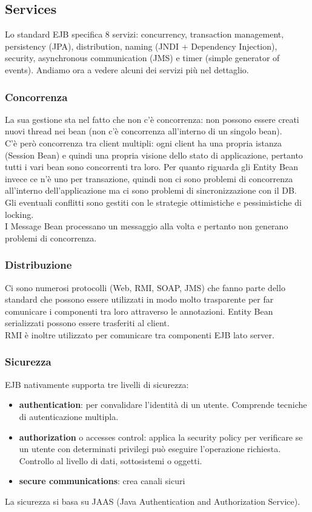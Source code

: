 \subsection{Services}
Lo standard EJB specifica 8 servizi: concurrency, transaction management, persistency (JPA), distribution, naming (JNDI + Dependency Injection), security, asynchronous communication (JMS) e timer (simple generator of events). Andiamo ora a vedere alcuni dei servizi più nel dettaglio.

\subsubsection{Concorrenza}
La sua gestione sta nel fatto che non c’è concorrenza: non possono essere creati nuovi thread nei bean (non c’è concorrenza all’interno di un singolo bean).\\

C’è però concorrenza tra client multipli: ogni client ha una propria istanza (Session Bean) e quindi una propria visione dello stato di applicazione, pertanto tutti i vari bean sono concorrenti tra loro. Per quanto riguarda gli Entity Bean invece ce n’è uno per transazione, quindi non ci sono problemi di concorrenza all’interno dell’applicazione ma ci sono problemi di sincronizzazione con il DB. Gli eventuali conflitti sono gestiti con le strategie ottimistiche e pessimistiche di locking.\\

I Message Bean processano un messaggio alla volta e pertanto non generano problemi di concorrenza.


\subsubsection{Distribuzione}
Ci sono numerosi protocolli (Web, RMI, SOAP, JMS) che fanno parte dello standard che possono essere utilizzati in modo molto trasparente per far comunicare i componenti tra loro attraverso le annotazioni. Entity Bean serializzati possono essere trasferiti al client.\\
RMI è inoltre utilizzato per comunicare tra componenti EJB lato server.


\subsubsection{Sicurezza}
EJB nativamente supporta tre livelli di sicurezza: 
\begin{itemize}
    \item \textbf{authentication}: per convalidare l’identità di un utente. Comprende tecniche di autenticazione multipla.
    \item \textbf{authorization} o accesses control: applica la security policy per verificare se un utente con determinati privilegi può eseguire l’operazione richiesta. Controllo al livello di dati, sottosistemi o oggetti.
    \item \textbf{secure communications}: crea canali sicuri
\end{itemize}
La sicurezza si basa su JAAS (Java Authentication and Authorization Service).

